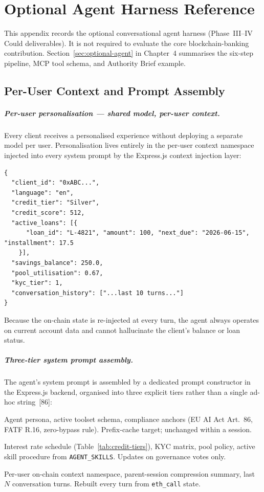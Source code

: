 \documentclass[12pt, a4paper]{report}
\begin{document}
\chapter{Optional Agent Harness Reference}
\label{app:agent-harness}

This appendix records the optional conversational agent harness (Phase~III--IV Could deliverables). It is not required to evaluate the core blockchain-banking contribution. Section~\ref{sec:optional-agent} in Chapter~4 summarises the six-step pipeline, MCP tool schema, and Authority Brief example.

\section{Per-User Context and Prompt Assembly}

\paragraph{Per-user personalisation --- shared model, per-user context.}
Every client receives a personalised experience without deploying a separate model per user. Personalisation lives entirely in the per-user context namespace injected into every system prompt by the Express.js context injection layer:

\begin{verbatim}
{
  "client_id": "0xABC...",
  "language": "en",
  "credit_tier": "Silver",
  "credit_score": 512,
  "active_loans": [{
      "loan_id": "L-4821", "amount": 100, "next_due": "2026-06-15", "installment": 17.5
    }],
  "savings_balance": 250.0,
  "pool_utilisation": 0.67,
  "kyc_tier": 1,
  "conversation_history": ["...last 10 turns..."]
}
\end{verbatim}

\noindent Because the on-chain state is re-injected at every turn, the agent always operates on current account data and cannot hallucinate the client's balance or loan status.

\paragraph{Three-tier system prompt assembly.}
The agent's system prompt is assembled by a dedicated prompt constructor in the Express.js backend, organised into three explicit tiers rather than a single ad-hoc string~[86]:

\begin{description}[noitemsep, leftmargin=0pt]
\item[\textbf{Stable tier.}] Agent persona, active toolset schema, compliance anchors (EU AI Act Art.~86, FATF R.16, zero-bypass rule). Prefix-cache target; unchanged within a session.
\item[\textbf{Context tier.}] Interest rate schedule (Table~\ref{tab:credit-tiers}), KYC matrix, pool policy, active skill procedure from \texttt{AGENT\_SKILLS}. Updates on governance votes only.
\item[\textbf{Volatile tier.}] Per-user on-chain context namespace, parent-session compression summary, last $N$ conversation turns. Rebuilt every turn from \texttt{eth\_call} state.
\end{description}
\end{document}
